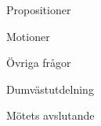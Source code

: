 \documentclass[prelim]{sektionsmote}
\begin{document}
\begin{ootd}
\item{Propositioner}

\item{Motioner}

\item{Övriga frågor}

\item{Dumvästutdelning}

\item{Mötets avslutande}
\end{ootd}

\begin{bilagor}
    
    
    

\end{bilagor}
\end{document}

